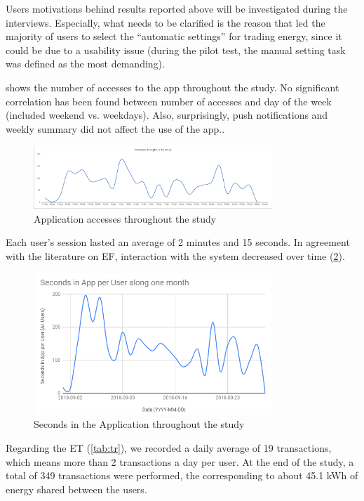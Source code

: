 Users motivations behind results reported above will be investigated during the interviews. Especially, what needs to be clarified is the reason that led the majority of users to select the “automatic settings” for trading energy, since it could be due to a usability issue (during the pilot test, the manual setting task was defined as the most demanding).  

 shows the number of accesses to the app throughout the study. No significant correlation has been found between number of accesses and day of the week (included weekend vs. weekdays). Also, surprisingly, push notifications and weekly summary did not affect the use of the app.. 


 \begin{figure}[h]
\centering
\includegraphics[width=0.8\textwidth]{./Images/graph2}
\caption{Application accesses throughout the study }
\label{fig:gr2}
\end{figure}

Each user’s session lasted an average of 2 minutes and 15 seconds. In agreement with the literature on EF, interaction with the system decreased over time (\cref{fig:gr3}). 


 \begin{figure}[h]
\centering
\includegraphics[width=0.8\textwidth]{./Images/graph3}
\caption{Seconds in the Application throughout the study}
\label{fig:gr3}
\end{figure}

Regarding the \ac{ET} (\cref{tab:tr}), we recorded a daily average of 19 transactions, which means more than 2 transactions a day per user. 
At the end of the study, a total of 349 transactions were performed, the corresponding to about 45.1 kWh of energy shared between the users. 



